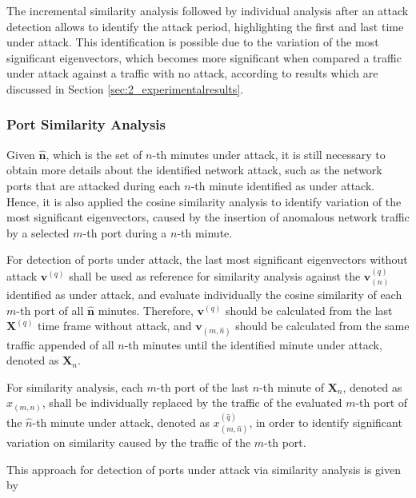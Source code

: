 The incremental similarity analysis followed by individual analysis after an attack detection allows to identify the attack period, highlighting the first and last time under attack. This identification is possible due to the variation of the most significant eigenvectors, which becomes more significant when compared a traffic under attack against a traffic with no attack, according to results which are discussed in Section \ref{sec:2_experimentalresults}.

\subsubsection{Port Similarity Analysis}
\label{sec:2_prop_PortSimilarityAnalysis}

Given $\hat{\pmb{n}}$, which is the set of $n$-th minutes under attack, it is still necessary to obtain more details about the identified network attack, such as the network ports that are attacked during each $n$-th minute identified as under attack. Hence, it is also applied the cosine similarity analysis to identify variation of the most significant eigenvectors, caused by the insertion of anomalous network traffic by a selected $m$-th port during a $n$-th minute. 

For detection of ports under attack, the last most significant eigenvectors without attack $\pmb{v}^{(q)}$ shall be used as reference for similarity analysis against the $\pmb{v}_{(n)}^{(q)}$ identified as under attack, and evaluate individually the cosine similarity of each $m$-th port of all $\hat{\pmb{n}}$ minutes. Therefore, $\pmb{v}^{(q)}$ should be calculated from the last $\pmb{X}^{(q)}$ time frame without attack, and $\pmb{v}_{(m,\hat{n})}$ should be calculated from the same traffic appended of all $n$-th minutes until the identified minute under attack, denoted as $\pmb{X}_n$. 

For similarity analysis, each $m$-th port of the last $n$-th minute of $\pmb{X}_n$, denoted as $x_{(m,n)}$, shall be individually replaced by the traffic of the evaluated $m$-th port of the $\hat{n}$-th minute under attack, denoted as $x^{(\hat{q})}_{(m,\hat{n})}$, in order to identify significant variation on similarity caused by the traffic of the $m$-th port. 

This approach for detection of ports under attack via similarity analysis is given by

